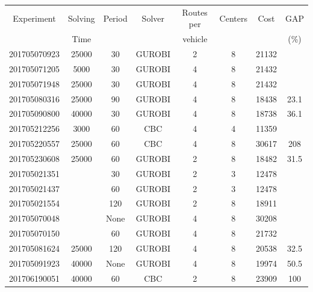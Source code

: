 \begin{center}
\begin{tabular}{c|c|c|c|c|c|c|c}
Experiment    & Solving  &  Period  &    Solver   &   Routes per &Centers &  Cost       &   GAP   \\
              & Time     &          &             &    vehicle   &        &             &   (\%)   \\ \hline
201705070923  & 25000         &  30      &    GUROBI   &   2          &  8     &  21132      &       \\ \hline
201705071205  &  5000         &  30      &    GUROBI   &   4          &  8     &  21432      &       \\ \hline
201705071948  & 25000         &  30      &    GUROBI   &   4          &  8     &  21432      &       \\ \hline
201705080316  & 25000         &  90      &    GUROBI   &   4          &  8     &  18438   &  23.1    \\ \hline
201705090800  & 40000         &  30      &    GUROBI   &   4          &  8     &  18738   &  36.1     \\ \hline
201705212256  & 3000          &  60      &    CBC      &   4          &  4     &  11359   &       \\ \hline
201705220557  & 25000         &  60      &    CBC      &   4          &  8     &  30617    &  208    \\ \hline
201705230608  & 25000         &  60      &    GUROBI   &   2          &  8     &  18482    &  31.5    \\ \hline
201705021351  &               &  30      &    GUROBI   &   2          &  3     &  12478   &       \\ \hline
201705021437  &               &  60      &    GUROBI   &   2          &  3     &  12478   &       \\ \hline
201705021554  &               & 120      &    GUROBI   &   2          &  8     &  18911   &       \\ \hline
201705070048    &             & None     &  GUROBI      &   4           &   8   &   30208 &      \\ \hline
201705070150    &               &   60      &   GUROBI  &   4           &   8   &   21732    &          \\ \hline
201705081624   & 25000         &   120      &   GUROBI  &   4           &   8   &   20538    &  32.5 \\ \hline
201705091923   & 40000         &   None      &   GUROBI  &   4           &   8   &   19974    &  50.5 \\ \hline
201706190051   & 40000         &   60      &   CBC  &   2           &   8   &   23909    &  100 \\ \hline
    \end{tabular}
\end{center}

